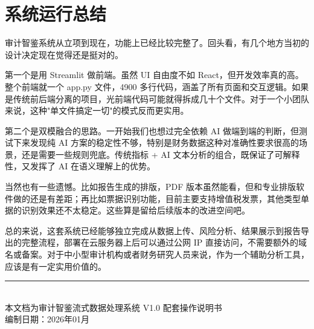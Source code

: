 \documentclass[12pt,a4paper]{ctexart}
\begin{document}
\section{系统运行总结}

审计智鉴系统从立项到现在，功能上已经比较完整了。回头看，有几个地方当初的设计决定现在觉得还是挺对的。

第一个是用 Streamlit 做前端。虽然 UI 自由度不如 React，但开发效率真的高。整个前端就一个 app.py 文件，4900 多行代码，涵盖了所有页面和交互逻辑。如果是传统前后端分离的项目，光前端代码可能就得拆成几十个文件。对于一个小团队来说，这种"单文件搞定一切"的模式反而更实用。

第二个是双模融合的思路。一开始我们也想过完全依赖 AI 做端到端的判断，但测试下来发现纯 AI 方案的稳定性不够，特别是财务数据这种对准确性要求很高的场景，还是需要一些规则兜底。传统指标 + AI 文本分析的组合，既保证了可解释性，又发挥了 AI 在语义理解上的优势。

当然也有一些遗憾。比如报告生成的排版，PDF 版本虽然能看，但和专业排版软件做的还是有差距；再比如票据识别功能，目前主要支持增值税发票，其他类型单据的识别效果还不太稳定。这些算是留给后续版本的改进空间吧。

总的来说，这套系统已经能够独立完成从数据上传、风险分析、结果展示到报告导出的完整流程，部署在云服务器上后可以通过公网 IP 直接访问，不需要额外的域名或备案。对于中小型审计机构或者财务研究人员来说，作为一个辅助分析工具，应该是有一定实用价值的。

\vspace{2cm}
\begin{center}
\rule{0.6\textwidth}{0.4pt}\\[0.5em]
{\small 本文档为审计智鉴流式数据处理系统 V1.0 配套操作说明书}\\
{\small 编制日期：2026年01月}
\end{center}
\end{document}

